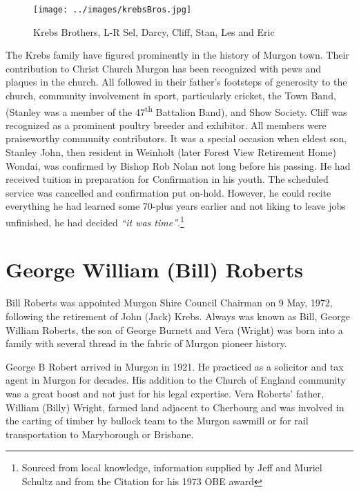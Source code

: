 \begin{figure}
\begin{center}
\texttt{[image: ../images/krebsBros.jpg]}
\caption{Krebs Brothers, L-R Sel, Darcy, Cliff, Stan, Les and Eric}
\end{center}
\end{figure}




The Krebs family have figured prominently in the history of Murgon town. Their contribution to Christ Church Murgon has been recognized with pews and plaques in the church. All followed in their father's footsteps of generosity to the church, community involvement in sport, particularly cricket, the Town Band, (Stanley was a member of the 47\textsuperscript{th} Battalion Band), and Show Society. Cliff was recognized as a prominent poultry breeder and exhibitor. All members were praiseworthy community contributors. It was a special occasion when eldest son, Stanley John, then resident in Weinholt (later Forest View Retirement Home) Wondai, was confirmed by Bishop Rob Nolan not long before his passing. He had received tuition in preparation for Confirmation in his youth. The scheduled service was cancelled and confirmation put on-hold. However, he could recite everything he had learned some 70-plus years earlier and not liking to leave jobs unfinished, he had decided \emph{``it was time''}.\footnote{Sourced from local knowledge, information supplied by Jeff and Muriel Schultz and from the Citation for his 1973 OBE award}


\section{George William (Bill) Roberts}



Bill Roberts was appointed Murgon Shire Council Chairman on 9 May, 1972, following the retirement of John (Jack) Krebs. Always was known as Bill, George William Roberts, the son of George Burnett and Vera (Wright) was born into a family with several thread in the fabric of Murgon pioneer history.



George B Robert arrived in Murgon in 1921. He practiced as a solicitor and tax agent in Murgon for decades. His addition to the Church of England community was a great boost and not just for his legal expertise. Vera Roberts' father, William (Billy) Wright, farmed land adjacent to Cherbourg and was involved in the carting of timber by bullock team to the Murgon sawmill or for rail transportation to Maryborough or Brisbane.



